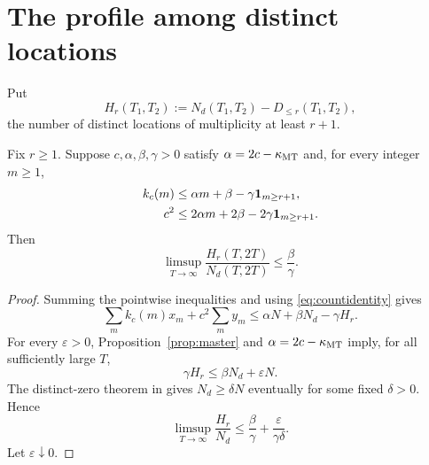 \section{The profile among distinct locations}

Put
\[
H_r(T_1,T_2):=N_d(T_1,T_2)-D_{\leq r}(T_1,T_2),
\]
the number of distinct locations of multiplicity at least $r+1$.

\begin{lemma}\label{lem:distmaj}
Fix $r\geq1$.  Suppose $c,\alpha,\beta,\gamma>0$ satisfy $\alpha=2c-\kappa_{\mathrm{MT}}$ and, for every integer $m\geq1$,
\begin{align}
k_c(m)&\leq \alpha m+\beta-\gamma\mathbf 1_{m\geq r+1},\label{eq:diston}\\
c^2&\leq 2\alpha m+2\beta-2\gamma\mathbf 1_{m\geq r+1}.\label{eq:distpair}
\end{align}
Then
\begin{equation}\label{eq:distgeneric}
\limsup_{T\to\infty}\frac{H_r(T,2T)}{N_d(T,2T)}\leq\frac{\beta}{\gamma}.
\end{equation}
\end{lemma}

\begin{proof}
Summing the pointwise inequalities and using \eqref{eq:countidentity} gives
\[
\sum_m k_c(m)x_m+c^2\sum_m y_m
\leq \alpha N+\beta N_d-\gamma H_r.
\]
For every $\varepsilon>0$, Proposition~\ref{prop:master} and $\alpha=2c-\kappa_{\mathrm{MT}}$ imply, for all sufficiently large $T$,
\[
\gamma H_r\leq\beta N_d+\varepsilon N.
\]
The distinct-zero theorem in \cite{Claude2026} gives $N_d\geq\delta N$ eventually for some fixed $\delta>0$.  Hence
\[
\limsup_{T\to\infty}\frac{H_r}{N_d}
\leq\frac{\beta}{\gamma}+\frac{\varepsilon}{\gamma\delta}.
\]
Let $\varepsilon\downarrow0$.
\end{proof}

